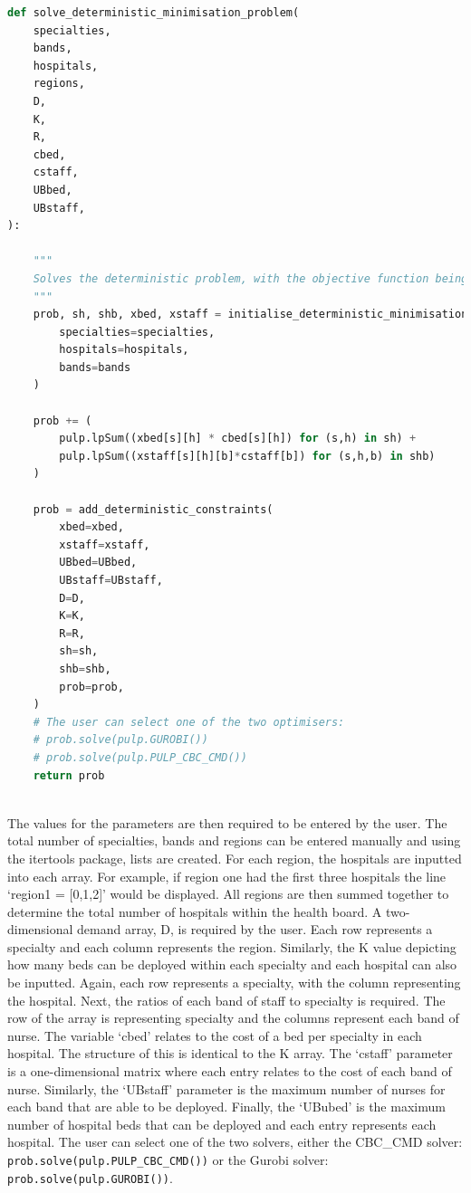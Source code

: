 \documentclass[../thesis.tex]{subfiles}
\begin{document}
\begin{lstlisting}[language= python]
def solve_deterministic_minimisation_problem(
    specialties,
    bands,
    hospitals,
    regions,
    D,
    K,
    R,
    cbed,
    cstaff,
    UBbed,
    UBstaff,
):
   
    """
    Solves the deterministic problem, with the objective function being minimised.
    """
    prob, sh, shb, xbed, xstaff = initialise_deterministic_minimisation_problem(
        specialties=specialties, 
        hospitals=hospitals, 
        bands=bands
    )
    
    prob += (
        pulp.lpSum((xbed[s][h] * cbed[s][h]) for (s,h) in sh) +
        pulp.lpSum((xstaff[s][h][b]*cstaff[b]) for (s,h,b) in shb)
    )
    
    prob = add_deterministic_constraints(
        xbed=xbed, 
        xstaff=xstaff, 
        UBbed=UBbed, 
        UBstaff=UBstaff,
        D=D, 
        K=K,
        R=R,
        sh=sh,
        shb=shb,
        prob=prob,
    )
    # The user can select one of the two optimisers:
    # prob.solve(pulp.GUROBI())
    # prob.solve(pulp.PULP_CBC_CMD())
    return prob
  
\end{lstlisting}
The values for the parameters are then required to be entered by the user. The total number of specialties, bands and regions can be entered manually and using the itertools package, lists are created. For each region, the hospitals are inputted into each array. For example, if region one had the first three hospitals the line `region1 = [0,1,2]' would be displayed. All regions are then summed together to determine the total number of hospitals within the health board. A two-dimensional demand array, D, is required by the user. Each row represents a specialty and each column represents the region. Similarly, the K value depicting how many beds can be deployed within each specialty and each hospital can also be inputted. Again, each row represents a specialty, with the column representing the hospital. Next, the ratios of each band of staff to specialty is required. The row of the array is representing specialty and the columns represent each band of nurse. The variable `cbed' relates to the cost of a bed per specialty in each hospital. The structure of this is identical to the K array. The `cstaff' parameter is a one-dimensional matrix where each entry relates to the cost of each band of nurse. Similarly, the `UBstaff' parameter is the maximum number of nurses for each band that are able to be deployed. Finally, the `UBubed' is the maximum number of hospital beds that can be deployed and each entry represents each hospital. The user can select one of the two solvers, either the CBC\_CMD solver: \texttt{prob.solve(pulp.PULP\_CBC\_CMD())} or the Gurobi solver: \texttt{prob.solve(pulp.GUROBI())}.
   
\end{document}
